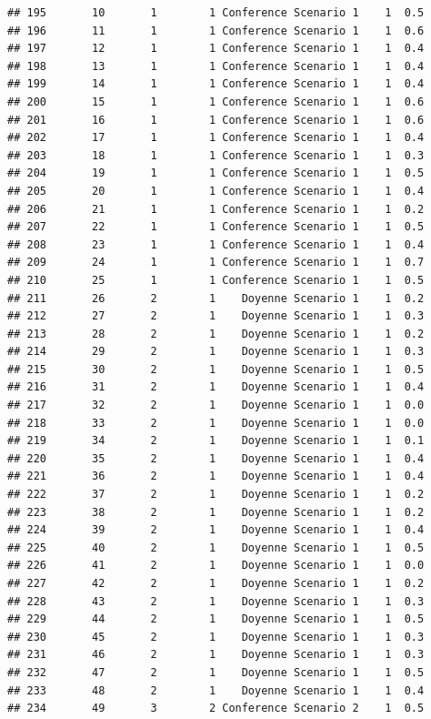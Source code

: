 \documentclass[
]{article}
\begin{document}
\begin{verbatim}
## 195       10       1        1 Conference Scenario 1    1  0.5
## 196       11       1        1 Conference Scenario 1    1  0.6
## 197       12       1        1 Conference Scenario 1    1  0.4
## 198       13       1        1 Conference Scenario 1    1  0.4
## 199       14       1        1 Conference Scenario 1    1  0.4
## 200       15       1        1 Conference Scenario 1    1  0.6
## 201       16       1        1 Conference Scenario 1    1  0.6
## 202       17       1        1 Conference Scenario 1    1  0.4
## 203       18       1        1 Conference Scenario 1    1  0.3
## 204       19       1        1 Conference Scenario 1    1  0.5
## 205       20       1        1 Conference Scenario 1    1  0.4
## 206       21       1        1 Conference Scenario 1    1  0.2
## 207       22       1        1 Conference Scenario 1    1  0.5
## 208       23       1        1 Conference Scenario 1    1  0.4
## 209       24       1        1 Conference Scenario 1    1  0.7
## 210       25       1        1 Conference Scenario 1    1  0.5
## 211       26       2        1    Doyenne Scenario 1    1  0.2
## 212       27       2        1    Doyenne Scenario 1    1  0.3
## 213       28       2        1    Doyenne Scenario 1    1  0.2
## 214       29       2        1    Doyenne Scenario 1    1  0.3
## 215       30       2        1    Doyenne Scenario 1    1  0.5
## 216       31       2        1    Doyenne Scenario 1    1  0.4
## 217       32       2        1    Doyenne Scenario 1    1  0.0
## 218       33       2        1    Doyenne Scenario 1    1  0.0
## 219       34       2        1    Doyenne Scenario 1    1  0.1
## 220       35       2        1    Doyenne Scenario 1    1  0.4
## 221       36       2        1    Doyenne Scenario 1    1  0.4
## 222       37       2        1    Doyenne Scenario 1    1  0.2
## 223       38       2        1    Doyenne Scenario 1    1  0.2
## 224       39       2        1    Doyenne Scenario 1    1  0.4
## 225       40       2        1    Doyenne Scenario 1    1  0.5
## 226       41       2        1    Doyenne Scenario 1    1  0.0
## 227       42       2        1    Doyenne Scenario 1    1  0.2
## 228       43       2        1    Doyenne Scenario 1    1  0.3
## 229       44       2        1    Doyenne Scenario 1    1  0.5
## 230       45       2        1    Doyenne Scenario 1    1  0.3
## 231       46       2        1    Doyenne Scenario 1    1  0.3
## 232       47       2        1    Doyenne Scenario 1    1  0.5
## 233       48       2        1    Doyenne Scenario 1    1  0.4
## 234       49       3        2 Conference Scenario 2    1  0.5

\end{verbatim}
\end{document}
